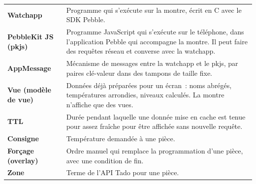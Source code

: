 \begin{longtable}{@{}>{\bfseries}p{42mm}p{118mm}@{}}
  Watchapp & Programme qui s'exécute sur la montre, écrit en C avec le SDK Pebble. \\
  PebbleKit JS (pkjs) & Programme JavaScript qui s'exécute sur le téléphone, dans l'application Pebble qui accompagne la montre. Il peut faire des requêtes réseau et converse avec la watchapp. \\
  AppMessage & Mécanisme de messages entre la watchapp et le pkjs, par paires clé-valeur dans des tampons de taille fixe. \\
  Vue (modèle de vue) & Données déjà préparées pour un écran~: noms abrégés, températures arrondies, niveaux calculés. La montre n'affiche que des vues. \\
  TTL & Durée pendant laquelle une donnée mise en cache est tenue pour assez fraîche pour être affichée sans nouvelle requête. \\
  Consigne & Température demandée à une pièce. \\
  Forçage (overlay) & Ordre manuel qui remplace la programmation d'une pièce, avec une condition de fin. \\
  Zone & Terme de l'API Tado pour une pièce. \\
\end{longtable}
